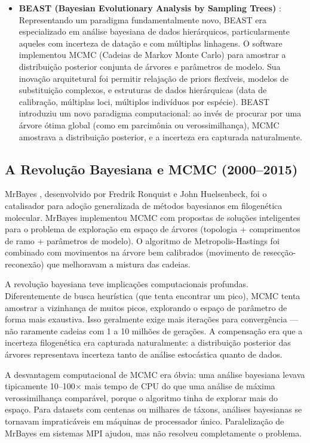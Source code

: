 \begin{itemize}
\item \textbf{BEAST (Bayesian Evolutionary Analysis by Sampling Trees)} \parencite{drummond2007}: Representando um paradigma fundamentalmente novo, BEAST era especializado em análise bayesiana de dados hierárquicos, particularmente aqueles com incerteza de datação e com múltiplas linhagens. O software implementou MCMC (Cadeias de Markov Monte Carlo) para amostrar a distribuição posterior conjunta de árvores e parâmetros de modelo. Sua inovação arquitetural foi permitir relajação de priors flexíveis, modelos de substituição complexos, e estruturas de dados hierárquicas (data de calibração, múltiplas loci, múltiplos indivíduos por espécie). BEAST introduziu um novo paradigma computacional: ao invés de procurar por uma árvore ótima global (como em parcimônia ou verossimilhança), MCMC amostrava a distribuição posterior, e a incerteza era capturada naturalmente.

\end{itemize}

\subsection{A Revolução Bayesiana e MCMC (2000--2015)}

MrBayes \parencite{ronquist2003}, desenvolvido por Fredrik Ronquist e John Huelsenbeck, foi o catalisador para adoção generalizada de métodos bayesianos em filogenética molecular. MrBayes implementou MCMC com propostas de soluções inteligentes para o problema de exploração em espaço de árvores (topologia + comprimentos de ramo + parâmetros de modelo). O algoritmo de Metropolis-Hastings foi combinado com movimentos na árvore bem calibrados (movimento de resecção-reconexão) que melhoravam a mistura das cadeias.

A revolução bayesiana teve implicações computacionais profundas. Diferentemente de busca heurística (que tenta encontrar um pico), MCMC tenta amostrar a vizinhança de muitos picos, explorando o espaço de parâmetro de forma mais exaustiva. Isso geralmente exige mais iterações para convergência --- não raramente cadeias com 1 a 10 milhões de gerações. A compensação era que a incerteza filogenética era capturada naturalmente: a distribuição posterior das árvores representava incerteza tanto de análise estocástica quanto de dados.

A desvantagem computacional de MCMC era óbvia: uma análise bayesiana levava tipicamente 10--100$\times$ mais tempo de CPU do que uma análise de máxima verossimilhança comparável, porque o algoritmo tinha de explorar mais do espaço. Para datasets com centenas ou milhares de táxons, análises bayesianas se tornavam impraticáveis em máquinas de processador único. Paralelização de MrBayes em sistemas MPI ajudou, mas não resolveu completamente o problema.

